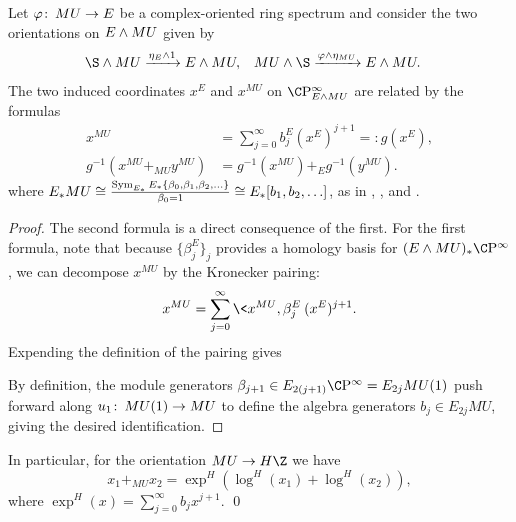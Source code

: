 \begin{lemma}\label{OrientationsOnEAndMU}
Let \(\varphi\colon\thinspace MU \to E\) be a complex-oriented ring spectrum and consider the two orientations on \(E \wedge MU\) given by
\begin{align*}
\S \sm MU & \xrightarrow{\eta_E \sm 1} E \sm MU, &
MU \sm \S & \xrightarrow{\phi \sm \eta_{MU}} E \sm MU.
\end{align*}
The two induced coordinates \(x^E\) and \(x^{MU}\) on \(\CP^\infty_{E \sm MU}\) are related by the formulas
\begin{align*}
x^{MU} & = \sum_{j=0}^\infty b_j^E (x^E)^{j+1} =: g(x^E), \\
g^{-1}(x^{MU} +_{MU} y^{MU}) & = g^{-1}(x^{MU}) +_E g^{-1}(y^{MU}).
\end{align*}
where \(E_* MU \cong \frac{\operatorname{Sym}_{E_*} E_*\{\beta_0, \beta_1, \beta_2, \ldots\}}{\beta_0 = 1} \cong E_*[b_1, b_2, \ldots]\), as in , , and .
\end{lemma}
\begin{proof}
The second formula is a direct consequence of the first.  For the first formula, note that because \(\{\beta_j^E\}_j\) provides a homology basis for \((E \sm MU)_* \CP^\infty\), we can decompose \(x^{MU}\) by the Kronecker pairing: \[x^{MU} = \sum_{j=0}^\infty \<x^{MU}, \beta_j^E\> (x^E)^{j+1}.\]  Expending the definition of the pairing gives
\begin{center}
\end{center}
By definition, the module generators \(\beta_{j+1} \in E_{2(j+1)} \CP^\infty = E_{2j} MU(1)\) push forward along \(u_1\colon\thinspace MU(1) \to MU\) to define the algebra generators \(b_j \in E_{2j} MU\), giving the desired identification.
\end{proof}

\begin{corollary}\label{HZMUCarriesALog}
In particular, for the orientation \(MU \to H\Z\) we have \[x_1 +_{MU} x_2 = \exp^H(\log^H(x_1) + \log^H(x_2)),\] where \(\exp^H(x) = \sum_{j=0}^\infty b_j x^{j+1}\). \qed
\end{corollary}


